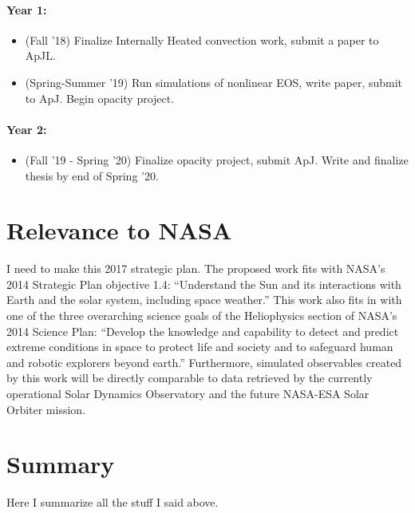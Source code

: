 \documentclass[aps, pre, onecolumn, nofootinbib, notitlepage, groupedaddress, amsfonts, amssymb, amsmath, longbibliography]{revtex4-1}
\begin{document}
\paragraph{Year 1:}
\begin{itemize}
\item (Fall '18) Finalize Internally Heated convection work, submit a paper to ApJL.
\item (Spring-Summer '19) Run simulations of nonlinear EOS, write paper, submit to ApJ.
Begin opacity project.
\end{itemize}

\paragraph{Year 2:}
\begin{itemize}
\item (Fall '19 - Spring '20) Finalize opacity project, submit ApJ.  Write and
finalize thesis by end of Spring '20.
\end{itemize}

\section{Relevance to NASA} 
I need to make this 2017 strategic plan.
The proposed work fits with NASA's 2014 Strategic Plan objective
1.4:
``Understand the Sun and its interactions with Earth and the solar
system, including space weather.''
This work also fits in with one of the three overarching science goals
of the Heliophysics section of NASA's 2014 Science Plan: 
``Develop the
knowledge and capability to detect and predict extreme conditions in space to
protect life and society and to safeguard human and robotic explorers beyond
earth.''  Furthermore, simulated observables created by this work will be
directly comparable to data retrieved by the currently operational Solar
Dynamics Observatory and the future NASA-ESA Solar Orbiter mission.

\section{Summary}
Here I summarize all the stuff I said above.




\end{document}
